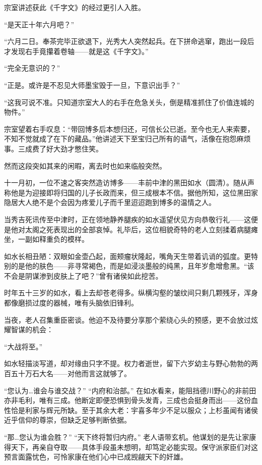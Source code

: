 \documentclass[
]{book}
\begin{document}
宗室讲述获此《千字文》的经过更引人入胜。

``是天正十年六月吧？''

``六月二日。奉茶完毕正欲退下，光秀大人突然起兵。在下拼命逃窜，跑出一段后才发现右手竟攥着卷轴------就是这《千字文》。''

``完全无意识的？''

``正是。或许是不忍见大师墨宝毁于一旦，下意识出手？''

``这我可说不准。只知道宗室大人的右手在危急关头，倒是精准抓住了价值连城的物件。''

宗室望着右手叹息：``带回博多后本想归还，可信长公已逝。至今也无人来索要，不知不觉就成了在下的藏品。''他讲述天下至宝归己所有的语气，活像在抱怨麻烦事。三成费了好大劲才憋住笑。

然而这段突如其来的闲暇，离去时也如来临般突然。

十一月初，一位不速之客突然造访博多------丰前中津的黑田如水（圆清）。随从声称他是为迎接即将归国的儿子长政而来，但三成根本不信。据他所知，这位黑田家隐居大人绝不是个会因为疼爱儿子而千里迢迢跑到博多的温情之人。

当秀吉死讯传至中津时，正在领地静养腿疾的如水遥望伏见方向恭敬行礼------这便是他对太阁之死表现出的全部哀悼。礼毕后，这位相貌奇特的老人立刻揉着病腿瘫坐，一副如释重负的模样。

如水长相丑陋：双眼如金壶凸起，面颊瘤状隆起，嘴角天生带着讥诮的弧度。更特别的是他的肤色------非寻常褐色，而是如浸淡墨般的纯黑，且年岁愈增愈黑。``该不会是阴谋渗到皮肤上了吧？''曾有诸侯如此挖苦。

时年五十三岁的如水，看上去却苍老得多。纵横沟壑的皱纹间只剩几颗残牙，浑身都像磨损过度的器械，唯有头脑依旧锋利。

当夜，老人召集重臣密谈。他迫不及待要分享那个萦绕心头的预感，更不会放过炫耀智谋的机会：

``大战将至。''

如水轻描淡写道，却对缘由只字不提。权力者逝世，留下六岁幼主与野心勃勃的两百五十万石大名------对他而言这就够了。

``您认为\ldots 谁会与谁交战？''
``内府和治部。''
在如水看来，能阻挡德川野心的非前田亦非毛利，唯有三成。他断定即便恐惧到骨头发青，三成也会挺身而出------这份血性恰是利家与辉元所缺。至于其余大老：宇喜多年少不足以服众；上杉虽闻有诸侯近乎信仰的尊崇，但缺乏足够判断依据。

``那\ldots 您认为谁会胜？''
``天下终将暂归内府。''
老人语带玄机。他谋划的是先让家康得天下，再亲自夺取------具体手段虽未想明，却笃定必能实现。保守派家臣们对这预言面露忧色，可怜家康在他们心中已成觊觎天下的奸雄。
\end{document}
